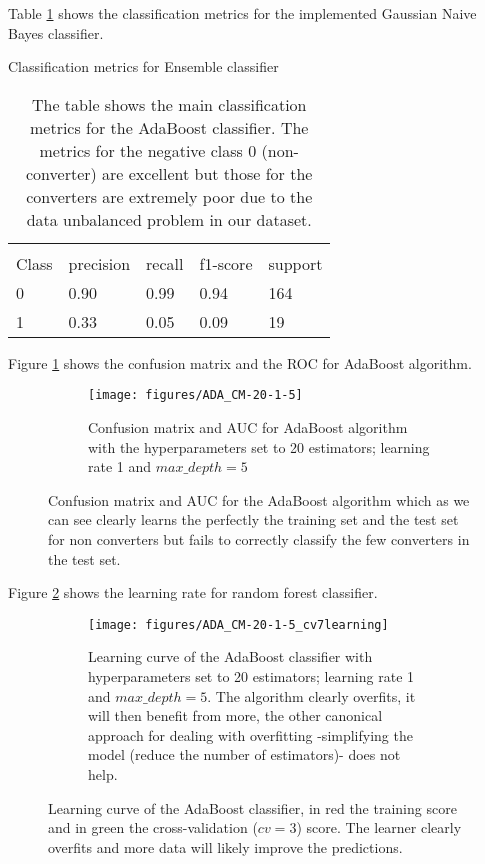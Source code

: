\documentclass[11pt]{article}
\theoremstyle{definition}
\theoremstyle{remark}
\begin{document}
Table \ref{tab:ada} shows the classification metrics for the implemented Gaussian Naive Bayes classifier.
\begin{table}[H]
\caption{Classification metrics for Ensemble classifier} 
\begin{center} 
\begin{tabular}{lllll}
\hline
\multicolumn{1}{c}{} \\
Class & precision & recall & f1-score & support     \\
\hline
0 & 0.90  &    0.99   &   0.94   &    164 \\
1 & 0.33  &    0.05   &   0.09   &    19 \\
\hline
\end{tabular}
\caption{The table shows the main classification metrics for the AdaBoost classifier. The metrics for the negative class 0 (non-converter) are excellent but those for the converters are extremely poor due to the data unbalanced problem in our dataset.
} \label{tab:ada} 
\end{center}
\end{table}

Figure \ref{fig:rf_ada} shows the confusion matrix and the ROC for AdaBoost algorithm. 
\begin{figure}[H]
    \centering
    \begin{subfigure}[t]{.8\textwidth}
        \centering
        \texttt{[image: figures/ADA\_CM-20-1-5]}
        \caption{Confusion matrix and AUC for AdaBoost algorithm with the hyperparameters set to 20 estimators; learning rate 1 and  $max\_depth=5$}
    \end{subfigure}

    
    \caption{Confusion matrix and AUC for the AdaBoost algorithm which as we can see clearly learns the perfectly the training set and the test set for non converters but fails to correctly classify the few converters in the test set. } \label{fig:rf_ada}
\end{figure}

Figure \ref{fig:rf_learning} shows the learning rate for random forest classifier. 
\begin{figure}[H]
    \centering
    \begin{subfigure}[t]{.8\textwidth}
        \centering
        \texttt{[image: figures/ADA\_CM-20-1-5\_cv7learning]}
        \caption{Learning curve of the AdaBoost classifier with  hyperparameters set to 20 estimators; learning rate 1 and  $max\_depth=5$. The algorithm clearly overfits, it will then benefit from more, the other canonical approach for dealing with overfitting -simplifying the model (reduce the number of estimators)- does not help.}
    \end{subfigure}

    
    \caption{Learning curve of the AdaBoost classifier, in red the training score and in green the cross-validation ($cv=3$) score. The learner clearly overfits and more data will likely improve the predictions.} \label{fig:rf_learning}
\end{figure}
\end{document}
